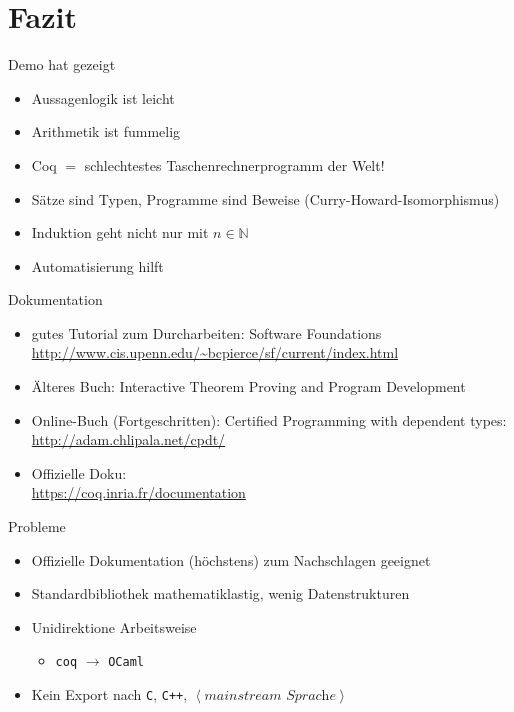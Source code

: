 \documentclass[aspectratio=169]{beamer}
\begin{document}
\section{Fazit}
\begin{frame}
  \begin{center}
    \Large{Demo hat gezeigt}
  \end{center}
  \begin{itemize}
  \item Aussagenlogik ist leicht
  \item Arithmetik ist fummelig
  \item Coq $=$ schlechtestes Taschenrechnerprogramm der Welt!
  \item Sätze sind Typen, Programme sind Beweise (Curry-Howard-Isomorphismus)
  \item Induktion geht nicht nur mit $n\in\mathbb{N}$
  \item Automatisierung hilft
  \end{itemize}
\end{frame}
\begin{frame}
  \begin{center}
    \Large{Dokumentation}
  \end{center}
  \begin{itemize}
  \item gutes Tutorial zum Durcharbeiten: Software Foundations\\
    \qquad \url{http://www.cis.upenn.edu/~bcpierce/sf/current/index.html}
  \item Älteres Buch: Interactive Theorem Proving and Program Development
  \item Online-Buch (Fortgeschritten): Certified Programming with dependent types:\\
    \qquad \url{http://adam.chlipala.net/cpdt/}
  \item Offizielle Doku:\\
    \qquad \url{https://coq.inria.fr/documentation}
  \end{itemize}
\end{frame}
\begin{frame}
  \begin{center}
    \Large{Probleme}
  \end{center}
  \begin{itemize}
  \item Offizielle Dokumentation (höchstens) zum Nachschlagen geeignet
  \item Standardbibliothek mathematiklastig, wenig Datenstrukturen
  \item Unidirektione Arbeitsweise 
    \begin{itemize}
    \item \texttt{coq} $\longrightarrow$ \texttt{OCaml}
    \end{itemize}
  \item Kein Export nach \texttt{C}, \texttt{C++}, $\left<\textit{mainstream Sprache}\right>$
  \end{itemize}
\end{frame} %
\end{document}
